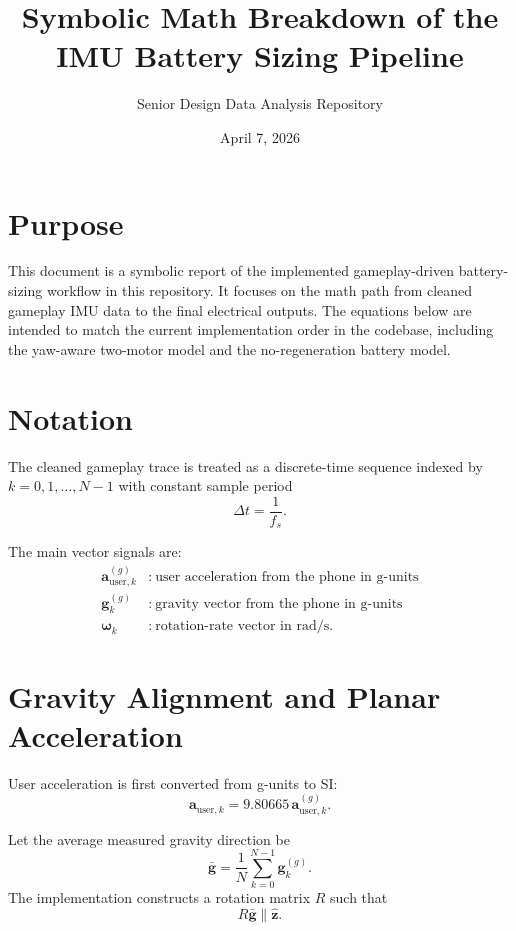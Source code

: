 \documentclass[11pt]{article}
\title{Symbolic Math Breakdown of the IMU Battery Sizing Pipeline}
\author{Senior Design Data Analysis Repository}
\date{April 7, 2026}
\begin{document}
\maketitle

\section*{Purpose}
This document is a symbolic report of the implemented gameplay-driven battery-sizing workflow in this repository. It focuses on the math path from cleaned gameplay IMU data to the final electrical outputs. The equations below are intended to match the current implementation order in the codebase, including the yaw-aware two-motor model and the no-regeneration battery model.

\section{Notation}
The cleaned gameplay trace is treated as a discrete-time sequence indexed by \(k = 0, 1, \dots, N-1\) with constant sample period
\begin{equation}
\Delta t = \frac{1}{f_s}.
\end{equation}

The main vector signals are:
\begin{align}
\bm{a}^{(g)}_{\mathrm{user},k} &:\ \text{user acceleration from the phone in g-units} \\
\bm{g}^{(g)}_k &:\ \text{gravity vector from the phone in g-units} \\
\bm{\omega}_k &:\ \text{rotation-rate vector in rad/s.}
\end{align}

\section{Gravity Alignment and Planar Acceleration}
User acceleration is first converted from g-units to SI:
\begin{equation}
\bm{a}_{\mathrm{user},k} = 9.80665 \, \bm{a}^{(g)}_{\mathrm{user},k}.
\end{equation}

Let the average measured gravity direction be
\begin{equation}
\bar{\bm{g}} = \frac{1}{N}\sum_{k=0}^{N-1}\bm{g}^{(g)}_k.
\end{equation}
The implementation constructs a rotation matrix \(R\) such that
\begin{equation}
R \bar{\bm{g}} \parallel \hat{\bm{z}}.
\end{equation}
\end{document}
